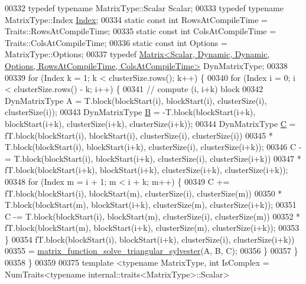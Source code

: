 \begin{DoxyCode}
00332   \textcolor{keyword}{typedef} \textcolor{keyword}{typename} MatrixType::Scalar Scalar;
00333   \textcolor{keyword}{typedef} \textcolor{keyword}{typename} MatrixType::Index \hyperlink{namespace_eigen_a62e77e0933482dafde8fe197d9a2cfde}{Index};
00334   \textcolor{keyword}{static} \textcolor{keyword}{const} \textcolor{keywordtype}{int} RowsAtCompileTime = Traits::RowsAtCompileTime;
00335   \textcolor{keyword}{static} \textcolor{keyword}{const} \textcolor{keywordtype}{int} ColsAtCompileTime = Traits::ColsAtCompileTime;
00336   \textcolor{keyword}{static} \textcolor{keyword}{const} \textcolor{keywordtype}{int} Options = MatrixType::Options;
00337   \textcolor{keyword}{typedef} 
      \hyperlink{group___core___module_class_eigen_1_1_matrix}{Matrix<Scalar, Dynamic, Dynamic, Options, RowsAtCompileTime, ColsAtCompileTime>}
       DynMatrixType;
00338 
00339   \textcolor{keywordflow}{for} (Index k = 1; k < clusterSize.rows(); k++) \{
00340     \textcolor{keywordflow}{for} (Index i = 0; i < clusterSize.rows() - k; i++) \{
00341       \textcolor{comment}{// compute (i, i+k) block}
00342       DynMatrixType A = T.block(blockStart(i), blockStart(i), clusterSize(i), clusterSize(i));
00343       DynMatrixType \hyperlink{group___core___module_class_eigen_1_1_matrix}{B} = -T.block(blockStart(i+k), blockStart(i+k), clusterSize(i+k), clusterSize(i+k));
00344       DynMatrixType \hyperlink{group___core___module_class_eigen_1_1_matrix}{C} = fT.block(blockStart(i), blockStart(i), clusterSize(i), clusterSize(i))
00345         * T.block(blockStart(i), blockStart(i+k), clusterSize(i), clusterSize(i+k));
00346       C -= T.block(blockStart(i), blockStart(i+k), clusterSize(i), clusterSize(i+k))
00347         * fT.block(blockStart(i+k), blockStart(i+k), clusterSize(i+k), clusterSize(i+k));
00348       \textcolor{keywordflow}{for} (Index m = i + 1; m < i + k; m++) \{
00349         C += fT.block(blockStart(i), blockStart(m), clusterSize(i), clusterSize(m))
00350           * T.block(blockStart(m), blockStart(i+k), clusterSize(m), clusterSize(i+k));
00351         C -= T.block(blockStart(i), blockStart(m), clusterSize(i), clusterSize(m))
00352           * fT.block(blockStart(m), blockStart(i+k), clusterSize(m), clusterSize(i+k));
00353       \}
00354       fT.block(blockStart(i), blockStart(i+k), clusterSize(i), clusterSize(i+k))
00355         = \hyperlink{namespace_eigen_1_1internal_a9f7e5b9803071057e7ed4e887da4a1bb}{matrix\_function\_solve\_triangular\_sylvester}(A, B, C);
00356     \}
00357   \}
00358 \}
00359 
00375 template <typename MatrixType, int IsComplex = NumTraits<typename internal::traits<MatrixType>::Scalar>

\end{DoxyCode}
